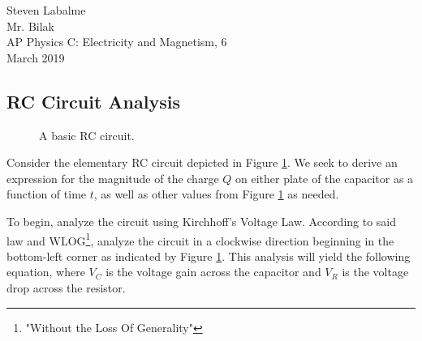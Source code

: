 \documentclass{article}
\begin{document}
\noindent Steven Labalme\\
\noindent Mr. Bilak\\
\noindent AP Physics C: Electricity and Magnetism, 6\\
 March 2019\\

\begin{center}
    \section*{RC Circuit Analysis}
\end{center}

\begin{figure}[h!]
    \centering
    \caption{A basic RC circuit.}
    \label{fig:RC}
\end{figure}

Consider the elementary RC circuit depicted in Figure \ref{fig:RC}. We seek to derive an expression for the magnitude of the charge $Q$ on either plate of the capacitor as a function of time $t$, as well as other values from Figure \ref{fig:RC} as needed.\par
To begin, analyze the circuit using Kirchhoff's Voltage Law. According to said law and WLOG\footnote{"Without the Loss Of Generality"}, analyze the circuit in a clockwise direction beginning in the bottom-left corner as indicated by Figure \ref{fig:RC}. This analysis will yield the following equation, where $V_C$ is the voltage gain across the capacitor and $V_R$ is the voltage drop across the resistor.
\end{document}
